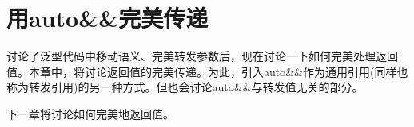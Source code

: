 \chapter{用auto\&\&完美传递}
讨论了泛型代码中移动语义、完美转发参数后，现在讨论一下如何完美处理返回值。本章中，将讨论返回值的完美传递。为此，引入auto\&\&作为通用引用(同样也称为转发引用)的另一种方式。但也会讨论auto\&\&与转发值无关的部分。

下一章将讨论如何完美地返回值。





